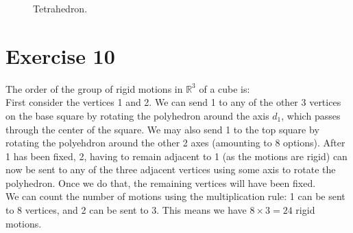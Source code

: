 \documentclass{article}
\newcommand{\R}{\mathbb{R}}
\begin{document}
\begin{figure}[H]

        \caption{\label{fig:figure1} Tetrahedron.}
    \end{figure}


    \section*{Exercise 10}
    The order of the group of rigid motions in $\R^3$ of a cube is: \\
    First consider the vertices 1 and 2.
    We can send 1 to any of the other 3 vertices on the base square by
    rotating the polyhedron around the axis $d_1$, which passes through
    the center of the square. We may also send 1 to the top square by
    rotating the polyehdron around the other 2 axes (amounting to 8 options).
    After 1 has been fixed, 2, having to remain adjacent to 1 (as the
    motions are rigid) can now be sent to any of the three adjacent vertices
    using some axis to rotate the polyhedron. Once we do that, the
    remaining vertices will have been fixed. \\
    We can count the number of motions using the multiplication rule:
    1 can be sent to 8 vertices, and 2 can be sent to 3. This means we
    have $8 \times 3 = 24$ rigid motions. 
\end{document}
